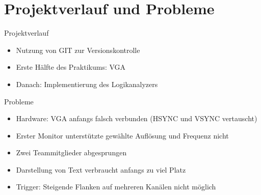 \section{Projektverlauf und Probleme}
\begin{frame}[<+->]{Projektverlauf}
    \begin{itemize}
        \item Nutzung von GIT zur Versionskontrolle
        \item Erste Hälfte des Praktikums: VGA
        \item Danach: Implementierung des Logikanalyzers
    \end{itemize}
\end{frame}
\begin{frame}[<+->]{Probleme}
    \begin{itemize}
        \item Hardware: VGA anfangs falsch verbunden (HSYNC und VSYNC vertauscht)
        \item Erster Monitor unterstützte gewählte Auflösung und Frequenz nicht
        \item Zwei Teammitglieder abgesprungen
        \item Darstellung von Text verbraucht anfangs zu viel Platz
        \item Trigger: Steigende Flanken auf mehreren Kanälen nicht möglich
    \end{itemize}
\end{frame}

